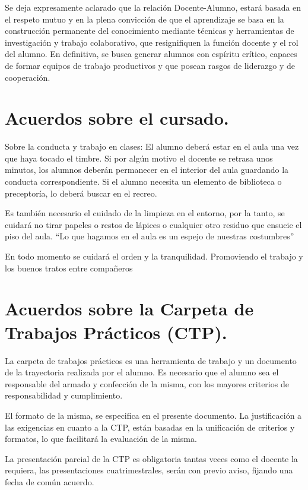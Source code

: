 \documentclass[../main]{subfiles}
\begin{document}
Se deja expresamente aclarado que la relación Docente-Alumno, estará basada en el respeto mutuo y en la plena convicción de que el aprendizaje se basa en la construcción permanente del conocimiento mediante técnicas y herramientas de investigación y trabajo colaborativo, que resignifiquen la función docente y el rol del alumno. En definitiva, se busca generar alumnos con espíritu crítico, capaces de formar equipos de trabajo productivos y que posean rasgos de liderazgo y de cooperación. 

 

\section{Acuerdos sobre el cursado.} 
 Sobre la conducta y trabajo en clases:
 El alumno deberá estar en el aula una vez que haya tocado el timbre. Si por algún motivo el docente se retrasa unos minutos, los alumnos deberán permanecer en el interior del aula guardando la conducta correspondiente. Si el alumno necesita un elemento de biblioteca o preceptoría, lo deberá buscar en el recreo. 

 Es también necesario el cuidado de la limpieza en el entorno, por la tanto, se cuidará no tirar papeles o restos de lápices o cualquier otro residuo que ensucie el piso del aula. “Lo que hagamos en el aula es un espejo de nuestras costumbres” 

En todo momento se cuidará el orden y la tranquilidad. Promoviendo el trabajo y los buenos tratos entre compañeros 

 

\section{Acuerdos sobre la Carpeta de Trabajos Prácticos (CTP). }

La carpeta de trabajos prácticos es una herramienta de trabajo y un documento de la trayectoria realizada por el alumno. Es necesario que el alumno sea el responsable del armado y confección de la misma, con los mayores criterios de responsabilidad y cumplimiento.  

El formato de la misma, se especifica en el presente documento. La justificación a las exigencias en cuanto a la CTP, están basadas en la unificación de criterios y formatos, lo que facilitará la evaluación de la misma.  

La presentación parcial de la CTP es obligatoria tantas veces como el docente la requiera, las presentaciones cuatrimestrales, serán con previo aviso, fijando una fecha de común acuerdo. 
\end{document}
